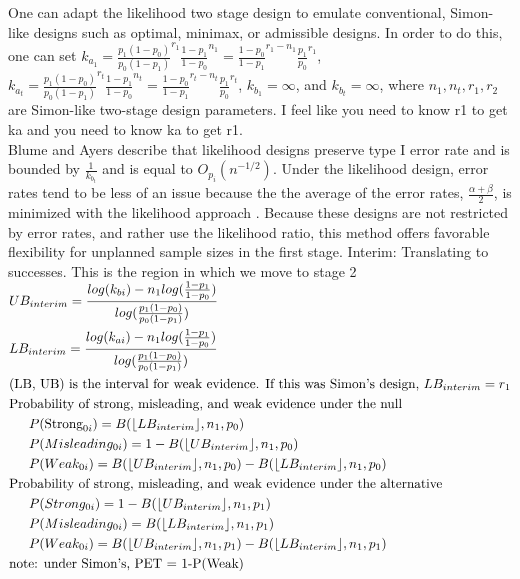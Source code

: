 \documentclass[12pt]{report}\usepackage[]{graphicx}\usepackage[]{color}
\DeclarePairedDelimiter\floor{\lfloor}{\rfloor}
\newlength{\li}\setlength{\li}{14.48pt}
\newlength{\di}\setlength{\di}{-3.5mm}
\begin{document}
\indent One can adapt the likelihood two stage design to emulate conventional, Simon-like designs such as optimal, minimax, or admissible designs. In order to do this, one can set $k_{a_1} = \frac{p_1(1-p_0)}{p_0(1-p_1)}^{r_1} \frac{1-p_1}{1-p_0}^{n_1} = \frac{1-p_0}{1-p_1}^{r_1-n_1}\frac{p_1}{p_0}^{r_1}$, $k_{a_t}  = \frac{p_1(1-p_0)}{p_0(1-p_1)}^{r_t} \frac{1-p_1}{1-p_0}^{n_t} = \frac{1-p_0}{1-p_1}^{r_t-n_t}\frac{p_1}{p_0}^{r_t}$, $k_{b_1} = \infty$, and $k_{b_t} = \infty$, where $n_1, n_t, r_1, r_2$ are Simon-like two-stage design parameters. I feel like you need to know r1 to get ka and you need to know ka to get r1. \\ Blume and Ayers describe that likelihood designs preserve type I error rate and is bounded by $\frac{1}{k_{b_t}}$ and is equal to $O_{p_i}\left({n}^{-1/2}\right)$. Under the likelihood design, error rates tend to be less of an issue because the the average of the error rates, $\frac{\alpha + \beta}{2}$, is minimized with the likelihood approach \cite{Blume}. Because these designs are not restricted by error rates, and rather use the likelihood ratio, this method offers favorable flexibility for unplanned sample sizes in the first stage. 
\newline
Interim: Translating to successes. This is the region in which we move to stage 2\\

$\begin{aligned}
& UB_{interim} = \frac{log(k_{bi}) - n_1 log(\frac{1-p_1}{1-p_0})}{log(\frac{p_1(1-p_0)}{p_0(1-p_1)})} \\
& LB_{interim} = \frac{log(k_{ai}) - n_1 log(\frac{1-p_1}{1-p_0})}{log(\frac{p_1(1-p_0)}{p_0(1-p_1)})} \\
&\text{(LB, UB) is the interval for weak evidence. If this was Simon's design, } LB_{interim} = r_1 \\
  &\text{Probability of strong, misleading, and weak evidence under the null} \\
  &\indent P(\mbox{Strong}_{0i}) = B(\floor*{LB_{interim}}, n_1, p_0) \\
  &\indent P(Misleading_{0i}) = 1-B(\floor*{UB_{interim}}, n_1, p_0) \\
  &\indent P(Weak_{0i}) = B(\floor*{UB_{interim}}, n_1, p_0) - B(\floor*{LB_{interim}}, n_1, p_0)\\
  &\text{Probability of strong, misleading, and weak evidence under the alternative} \\
  &\indent P(Strong_{0i}) = 1-B(\floor*{UB_{interim}}, n_1, p_1) \\
  &\indent P(Misleading_{0i}) = B(\floor*{LB_{interim}}, n_1, p_1) \\
  &\indent P(Weak_{0i}) = B(\floor*{UB_{interim}}, n_1, p_1) - B(\floor*{LB_{interim}}, n_1, p_1) \\
  &\text{note: under Simon's, PET = 1-P(Weak)}
\end{aligned}$
  
\end{document}
